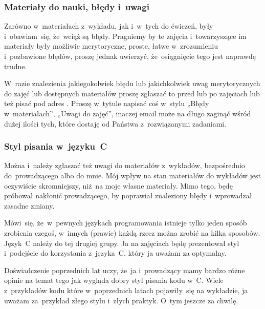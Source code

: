 \documentclass[10pt,t]{beamer}
\begin{document}
\begin{frame}
  \frametitle{Materiały do nauki, błędy i~uwagi}


  Zarówno w~materiałach z~wykładu, jak i~w~tych do ćwiczeń, były
  i~obawiam~się, że~wciąż są błędy. Pragniemy by te zajęcia i~towarzyszące
  im materiały były możliwie merytoryczne, proste, łatwe w~zrozumieniu
  i~pozbawione błędów, proszę jednak uwierzyć, że~osiągnięcie tego jest
  naprawdę trudne.

  W~razie znalezienia jakiegokolwiek błędu lub jakichkolwiek uwag
  merytorycznych do zajęć lub dostępnych materiałów proszę zgłaszać to
  przed lub po zajęciach lub też pisać pod adres \email. Proszę w~tytule
  napisać coś w~stylu „Błędy w~materiałach”, „Uwagi do zajęć”, inaczej
  email może na długo zaginąć wśród dużej ilości tych, które dostaję od
  Państwa z~rozwiązanymi zadaniami.

\end{frame}





\begin{frame}
  \frametitle{Styl pisania w~języku~C}


  Można i~należy zgłaszać też uwagi do materiałów z~wykładów, bezpośrednio
  do~prowadzącego albo do mnie. Mój wpływ na stan materiałów do wykładów
  jest oczywiście skromniejszy, niż~na moje własne materiały.
  Mimo tego, będę próbował nakłonić prowadzącego, by poprawiał znaleziony
  błędy i~wprowadzał zasadne zmiany.

  Mówi~się, że~w~pewnych językach programowania istnieje tylko jeden sposób
  zrobienia czegoś, w~innych (prawie) każdą rzecz można zrobić na kilka
  sposobów. Język~C należy do tej drugiej grupy. Ja na zajęciach będę
  prezentował styl i~podejście do korzystania z~języka~C, który ja uważam
  za optymalny.

  Doświadczenie poprzednich lat uczy, że~ja i~prowadzący mamy bardzo różne
  opinie na temat tego jak wygląda dobry styl pisania kodu w~C. Wiele
  z~przykładów kodu które w~poprzednich latach pojawiły~się na wykładzie,
  ja uważam za~przykład złego stylu i~złych praktyk. O~tym jeszcze za
  chwilę.

\end{frame}
\end{document}
